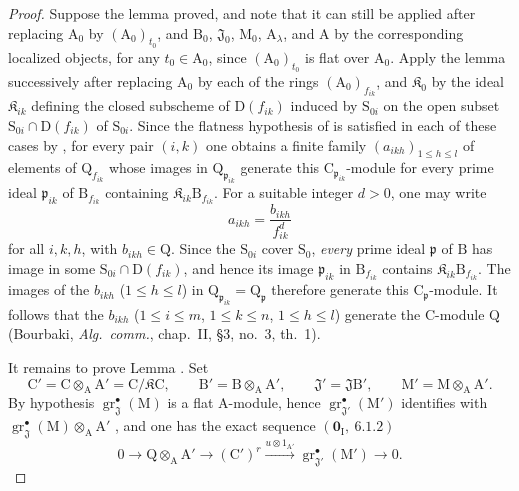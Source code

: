 \begin{proof}
Suppose the lemma proved, and note that it can still be applied after replacing
$\mathrm{A}_0$ by $(\mathrm{A}_0)_{t_0}$, and $\mathrm{B}_0$,
$\mathfrak{J}_0$, $\mathrm{M}_0$, $\mathrm{A}_\lambda$, and $\mathrm{A}$ by
the corresponding localized objects, for any $t_0\in\mathrm{A}_0$, since
$(\mathrm{A}_0)_{t_0}$ is flat over $\mathrm{A}_0$. Apply the lemma
successively after replacing $\mathrm{A}_0$ by each of the rings
$(\mathrm{A}_0)_{f_{ik}}$, and $\mathfrak K_0$ by the ideal
$\mathfrak K_{ik}$ defining the closed subscheme of $\mathrm{D}(f_{ik})$
induced by $\mathrm{S}_{0i}$ on the open subset
$\mathrm{S}_{0i}\cap\mathrm{D}(f_{ik})$ of $\mathrm{S}_{0i}$. Since the
flatness hypothesis of  is satisfied in each of these cases
by , for every pair $(i,k)$ one obtains a finite family
$(a_{ikh})_{1\leqslant h\leqslant l}$ of elements of
$\mathrm{Q}_{f_{ik}}$ whose images in $\mathrm{Q}_{\mathfrak{p}_{ik}}$
generate this $\mathrm{C}_{\mathfrak{p}_{ik}}$-module for every prime ideal
$\mathfrak{p}_{ik}$ of $\mathrm{B}_{f_{ik}}$ containing
$\mathfrak K_{ik}\mathrm{B}_{f_{ik}}$. For a suitable integer $d>0$, one
may write
\[
  a_{ikh}=\frac{b_{ikh}}{f_{ik}^{d}}
\]
for all $i,k,h$, with $b_{ikh}\in\mathrm{Q}$. Since the $\mathrm{S}_{0i}$ cover $\mathrm{S}_0$, \emph{every} prime ideal $\mathfrak{p}$ of $\mathrm{B}$ has image in some $\mathrm{S}_{0i}\cap\mathrm{D}(f_{ik})$, and hence its image $\mathfrak{p}_{ik}$ in $\mathrm{B}_{f_{ik}}$ contains $\mathfrak K_{ik}\mathrm{B}_{f_{ik}}$. The images of the $b_{ikh}$ ($1\leqslant h\leqslant l$) in $\mathrm{Q}_{\mathfrak{p}_{ik}}=\mathrm{Q}_{\mathfrak{p}}$ therefore generate this $\mathrm{C}_{\mathfrak{p}}$-module. It follows that the $b_{ikh}$ ($1\leqslant i\leqslant m$, $1\leqslant k\leqslant n$, $1\leqslant h\leqslant l$) generate the $\mathrm{C}$-module $\mathrm{Q}$ (Bourbaki, \emph{Alg.\ comm.}, chap.~II, \S3, no.~3, th.~1).

It remains to prove Lemma . Set
\[
  \mathrm{C}'=\mathrm{C}\otimes_\mathrm{A}\mathrm{A}'=\mathrm{C}/\mathfrak K\mathrm{C},\qquad
  \mathrm{B}'=\mathrm{B}\otimes_\mathrm{A}\mathrm{A}',\qquad
  \mathfrak{J}'=\mathfrak{J}\mathrm{B}',\qquad
  \mathrm{M}'=\mathrm{M}\otimes_\mathrm{A}\mathrm{A}'.
\]
By hypothesis $\operatorname{gr}^\bullet_\mathfrak{J}(\mathrm{M})$ is a flat $\mathrm{A}$-module, hence $\operatorname{gr}^\bullet_{\mathfrak{J}'}(\mathrm{M}')$ identifies with $\operatorname{gr}^\bullet_\mathfrak{J}(\mathrm{M})\otimes_\mathrm{A}\mathrm{A}'$ , and one has the exact sequence $(\mathbf{0}_\mathrm{I},~6.1.2)$
\begin{equation}
  0\longrightarrow\mathrm{Q}\otimes_\mathrm{A}\mathrm{A}'
  \longrightarrow(\mathrm{C}')^r
  \xrightarrow{u\otimes 1_{\mathrm{A}'}}
  \operatorname{gr}^\bullet_{\mathfrak{J}'}(\mathrm{M}')
  \longrightarrow 0.
  \label{IV.11.2.9.7}
\tag{11.2.9.7}
\end{equation}


\end{proof}
